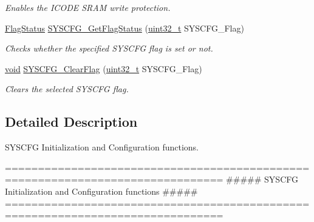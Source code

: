 \begin{DoxyCompactItemize}
\begin{DoxyCompactList}\small\item\em Enables the I\-C\-O\-D\-E S\-R\-A\-M write protection. \end{DoxyCompactList}\item 
\hyperlink{group___exported__types_ga89136caac2e14c55151f527ac02daaff}{Flag\-Status} \hyperlink{group___s_y_s_c_f_g___group1_gaa4a5d9419f2df8075d4e33e4a58aa257}{S\-Y\-S\-C\-F\-G\-\_\-\-Get\-Flag\-Status} (\hyperlink{stdint_8h_a435d1572bf3f880d55459d9805097f62}{uint32\-\_\-t} S\-Y\-S\-C\-F\-G\-\_\-\-Flag)
\begin{DoxyCompactList}\small\item\em Checks whether the specified S\-Y\-S\-C\-F\-G flag is set or not. \end{DoxyCompactList}\item 
\hyperlink{group___n_a_m_e_ga18028b8badbf1ea7e704ccac3c488e82}{void} \hyperlink{group___s_y_s_c_f_g___group1_ga9bef3d2e431f5c7494acc81589c73d0b}{S\-Y\-S\-C\-F\-G\-\_\-\-Clear\-Flag} (\hyperlink{stdint_8h_a435d1572bf3f880d55459d9805097f62}{uint32\-\_\-t} S\-Y\-S\-C\-F\-G\-\_\-\-Flag)
\begin{DoxyCompactList}\small\item\em Clears the selected S\-Y\-S\-C\-F\-G flag. \end{DoxyCompactList}\end{DoxyCompactItemize}


\subsection{Detailed Description}
S\-Y\-S\-C\-F\-G Initialization and Configuration functions. \begin{DoxyVerb} ===============================================================================
         ##### SYSCFG Initialization and Configuration functions #####
 ===============================================================================\end{DoxyVerb}
 


